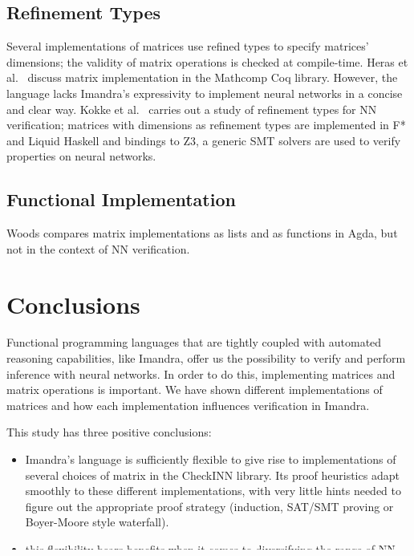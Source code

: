 \documentclass[runningheads]{llncs}
\begin{document}
\subsection{Refinement Types}
Several implementations of matrices use refined types to specify matrices' dimensions; the validity of matrix operations is checked at compile-time.
Heras et al.~\cite{heras_incidence_2011} discuss matrix implementation in the Mathcomp Coq library. However, the language lacks Imandra's expressivity to implement neural networks in a concise and clear way.
Kokke et al.~\cite{kokke_neural_2020} carries out a study of refinement types for NN verification; matrices with dimensions as refinement types are implemented in F* and Liquid Haskell and bindings to Z3, a generic SMT solvers are used to verify properties on neural networks.

\subsection{Functional Implementation}

Woods \cite{wood_vectors_2019} compares matrix implementations as lists and as functions in Agda, but not in the context of NN verification.
\fi


\section{Conclusions}
Functional programming languages that are tightly coupled with automated reasoning capabilities, like Imandra, offer us the possibility to verify and perform inference with neural networks. In order to do this, implementing matrices and matrix operations is important.
We have shown different implementations of matrices and how each implementation influences verification in Imandra.

This study has three positive conclusions:
\begin{itemize}
\item Imandra's language is sufficiently flexible to give rise to implementations of several choices of matrix in the CheckINN library. Its proof heuristics adapt smoothly to these different implementations, with very little hints needed to figure out the appropriate proof strategy (induction, SAT/SMT proving or Boyer-Moore style waterfall).

\item this flexibility bears benefits when it comes to diversifying the range of NN properties we verify: thus, matrices as lists made possible proofs of higher-order properties by induction, whereas matrices as functions were more amenable to automated proofs in SAT/SMT solving style.

\item the transition from integer-valued to real-valued NNs is possible in Imandra. This transition itself opens several choices for matrix representations. However, if the matrix representation is optimal for the task at hand, Imandra takes care of completing the proofs with reals and adapts its inductive waterfall method to the new data type automatically.
  This is a positive lesson to learn, as this is not always given in functional theorem provers.
\end{itemize}
\end{document}
